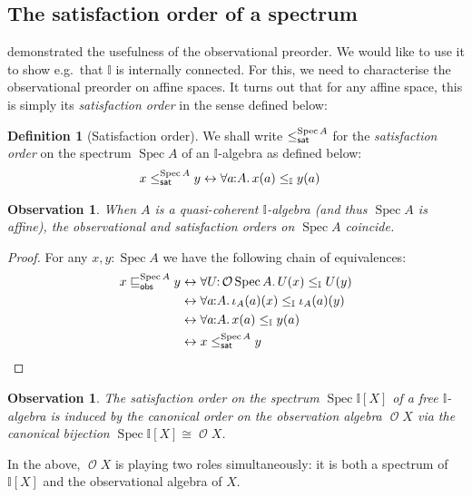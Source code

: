 \documentclass[a4paper,12pt]{amsart}
\newtheorem{observation}[theorem]{Observation}
\theoremstyle{definition}
\newtheorem{definition}[theorem]{Definition}
\newcommand{\mc}[1]{\mathcal{#1}}
\newcommand{\mbb}[1]{\mathbb{#1}}
\newcommand{\I}{\mbb I}
\newcommand{\fa}[2]{\forall #1\!\colon\!\!#2\mathpunct{.}}
\newcommand{\eq}{\leftrightarrow}
\newcommand{\spec}{\operatorname{Spec}}
\newcommand{\opens}{\operatorname{\mc{O}}} %
\begin{document}
\subsection{The satisfaction order of a spectrum}

 demonstrated the usefulness of the observational preorder. We would like to use it to show e.g.\ that $\I$ is internally connected. For this, we need to characterise the observational preorder on affine spaces. It turns out that for any affine space, this is simply its \emph{satisfaction order} in the sense defined below:


\begin{definition}[Satisfaction order]
  We shall write $\satle[\spec{A}]$ for the \emph{satisfaction order} on the spectrum $\spec{A}$ of an $\I$-algebra as defined below:
  \begin{align*}
    x\satle[\spec{A}] y 
    &\eq \fa{a}{A}
    x(a) \le_\I y(a) 
  \end{align*}
\end{definition}


\begin{observation}\label{lem:specorderofaffine}
  When $A$ is a quasi-coherent $\I$-algebra (and thus $\spec{A}$ is affine), the observational and satisfaction orders on $\spec{A}$ coincide.
\end{observation}
\begin{proof}
  For any $x,y:\spec{A}$ we have the following chain of equivalences:
  \begin{align*}
    x\obsle[\spec{A}] y 
    &\eq 
    \fa{U}{\opens{\spec{A}}} U(x) \le_{\I} U(y)
    \\ 
    &\eq 
    \fa{a}{A} 
    \iota_A(a)(x)
    \le_\I
    \iota_A(a)(y)
    \\ 
    &\eq 
    \fa{a}{A} 
    x(a)
    \le_\I
    y(a)
    \\ 
    &\eq 
    x\satle[\spec{A}] y
    \qedhere
  \end{align*}
\end{proof}

\begin{observation}
  The satisfaction order on the spectrum $\spec{\I[X]}$ of a free $\I$-algebra is induced by the canonical order on the \emph{observation algebra} $\opens{X}$ via the canonical bijection $\spec{\I[X]}\cong \opens{X}$.
\end{observation}

In the above, $\opens{X}$ is playing two roles simultaneously: it is both a spectrum of $\I[X]$ and the observational algebra of $X$.
\end{document}

